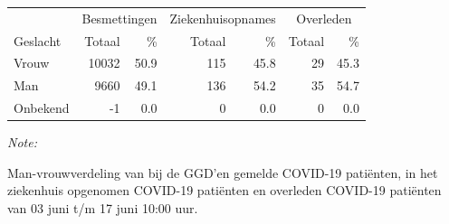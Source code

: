 \documentclass[
  english,
  man,floatsintext]{apa6}
\begin{document}
\begin{table}
\centering\begingroup\fontsize{11}{13}\selectfont

\begin{threeparttable}
\begin{tabular}{lrrrrrr}
\toprule
\multicolumn{1}{c}{ } & \multicolumn{2}{c}{Besmettingen} & \multicolumn{2}{c}{Ziekenhuisopnames} & \multicolumn{2}{c}{Overleden} \\
\cmidrule(l{3pt}r{3pt}){2-3} \cmidrule(l{3pt}r{3pt}){4-5} \cmidrule(l{3pt}r{3pt}){6-7}
Geslacht & Totaal & \% & Totaal & \% & Totaal & \%\\
\midrule
Vrouw & 10032 & 50.9 & 115 & 45.8 & 29 & 45.3\\
Man & 9660 & 49.1 & 136 & 54.2 & 35 & 54.7\\
Onbekend & -1 & 0.0 & 0 & 0.0 & 0 & 0.0\\
\bottomrule
\end{tabular}
\begin{tablenotes}
\item \textit{Note: } 
\item Man-vrouwverdeling van bij de GGD’en gemelde COVID-19 patiënten, in het ziekenhuis opgenomen COVID-19 patiënten en overleden COVID-19 patiënten van 03 juni t/m 17 juni 10:00 uur.
\end{tablenotes}
\end{threeparttable}
\endgroup{}
\end{table}
\newpage
\end{document}
